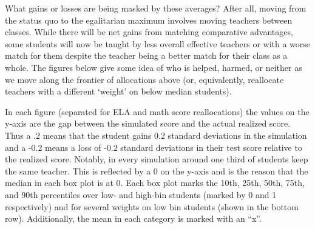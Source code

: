 \documentclass[12pt]{article}
\theoremstyle{definition}
\theoremstyle{definition}
\theoremstyle{definition}
\theoremstyle{definition}
\begin{document}
    What gains or losses are being masked by these averages? After all, moving from the status quo to the egalitarian maximum involves moving teachers between classes. While there will be net gains from matching comparative advantages, some students will now be taught by less overall effective teachers or with a worse match for them despite the teacher being a better match for their class as a whole. The figures below give some idea of who is helped, harmed, or neither as we move along the frontier of allocations above (or, equivalently, reallocate teachers with a different ‘weight’ on below median students).
	
	In each figure (separated for ELA and math score reallocations) the values on the y-axis are the gap between the simulated score and the actual realized score. Thus a .2 means that the student gains 0.2 standard deviations in the simulation and a -0.2 means a loss of -0.2 standard deviations in their test score relative to the realized score. Notably, in every simulation around one third of students keep the same teacher. This is reflected by a 0 on the y-axis and is the reason that the median in each box plot is at 0. Each box plot marks the 10th, 25th, 50th, 75th, and 90th percentiles over low- and high-bin students (marked by 0 and 1 respectively) and for several weights on low bin students (shown in the bottom row). Additionally, the mean in each category is marked with an “x”.
\end{document}
